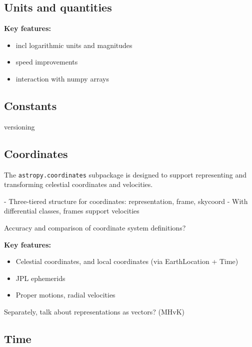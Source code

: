\documentclass[modern]{aastex61}
\begin{document}

\subsection{Units and quantities}
\label{sec:units}

\textbf{Key features:}
\begin{itemize}
	\item incl logarithmic units and magnitudes
	\item speed improvements
    \item interaction with numpy arrays
\end{itemize}

\subsection{Constants}
versioning


\subsection{Coordinates}
\label{sec:coordinates}

The \texttt{astropy.coordinates} subpackage is designed to support representing
and transforming celestial coordinates and velocities.


- Three-tiered structure for coordinates: representation, frame, skycoord
- With differential classes, frames support velocities

Accuracy and comparison of coordinate system definitions?

\textbf{Key features:}
\begin{itemize}
	\item Celestial coordinates, and local coordinates (via EarthLocation + Time)
	\item JPL ephemerids
    \item Proper motions, radial velocities
\end{itemize}

Separately, talk about representations as vectors? (MHvK)

\subsection{Time}
\label{sec:time}
\end{document}
